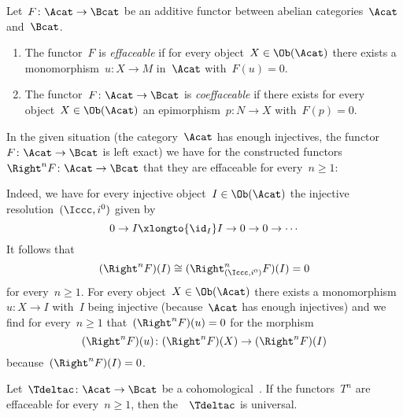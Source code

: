 \begin{definition}
  Let~$F \colon \Acat \to \Bcat$ be an additive functor between abelian categories~$\Acat$ and~$\Bcat$.
  \begin{enumerate}
    \item
      The functor~$F$ is \emph{effaceable} if for every object~$X \in \Ob(\Acat)$ there exists a monomorphism~$u \colon X \to M$ in~$\Acat$ with~$F(u) = 0$.
    \item
      The functor~$F \colon \Acat \to \Bcat$ is \emph{coeffaceable} if there exists for every object~$X \in \Ob(\Acat)$ an epimorphism~$p \colon N \to X$ with~$F(p) = 0$.
  \end{enumerate}
\end{definition}


\begin{remark}
  \label{construction is effaceable}
  In the given situation (the category~$\Acat$ has enough injectives, the functor~$F \colon \Acat \to \Bcat$ is left exact) we have for the constructed functors~$\Right^n F \colon \Acat \to \Bcat$ that they are effaceable for every~$n \geq 1$:
  
  Indeed, we have for every injective object~$I \in \Ob(\Acat)$ the injective resolution~$(\Iccc, i^0)$ given by
  \[
    0
    \to
    I
    \xlongto{\id_I}
    I
    \to
    0
    \to
    0
    \to
    \dotsb
  \]
  It follows that
  \[
    (\Right^n F)(I)
    \cong
    (\Right^n_{(\Iccc, i^0)} F)(I)
    =
    0
  \]
  for every~$n \geq 1$.
  For every object~$X \in \Ob(\Acat)$ there exists a monomorphism~$u \colon X \to I$ with~$I$ being injective (because~$\Acat$ has enough injectives) and we find for every~$n \geq 1$ that~$(\Right^n F)(u) = 0$ for the morphism
  \[
    (\Right^n F)(u)
    \colon
    (\Right^n F)(X)
    \to
    (\Right^n F)(I)
  \]
  because~$(\Right^n F)(I) = 0$.
\end{remark}


\begin{theorem}
  \label{effaceable is universal}
  Let~$\Tdeltac \colon \Acat \to \Bcat$ be a cohomological~{\deltafun}.
  If the functors~$T^n$ are effaceable for every~$n \geq 1$, then the~{\deltafun}~$\Tdeltac$ is universal.
\end{theorem}


